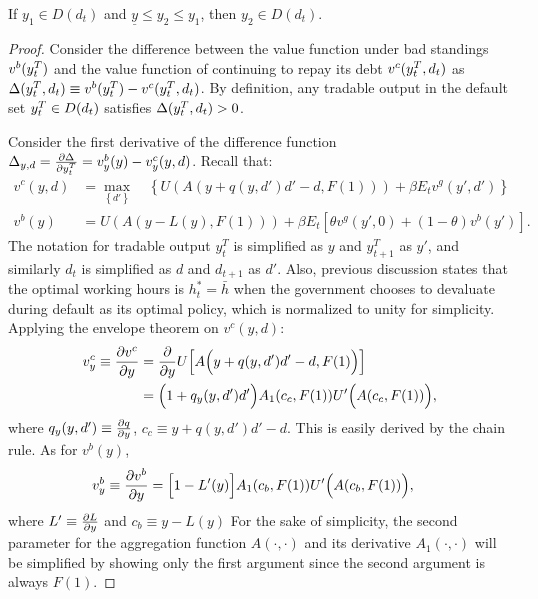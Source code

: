 \begin{proposition}
    \label{prop2}
    If $y_1 \in D(d_t)$ and $\underline{y}\le y_2 \le y_1$, then $y_2 \in D(d_t)$.
\end{proposition}
\begin{proof}
    Consider the difference between the value function under bad standings $v^b(y^T_{t})$ and the value function of continuing to repay its debt  $v^c(y^T_{t}, d_t)$ as $\Delta(y^T_{t}, d_t) \equiv v^b(y^T_{t}) - v^c(y^T_{t}, d_t)$. By definition, any tradable output in the default set $y^T_{t} \in D(d_t)$ satisfies $\Delta(y^T_{t}, d_t) >0$.

    Consider the first derivative of the difference function $\Delta_{y, d} = \pdv{\Delta}{y^T_t} = v^b_{y}(y) - v^c_{y}(y, d)$.
    Recall that:
    \begin{align*}
        v^c(y, d) &= \max_{\left\{d' \right\}} \quad
        \left\{
            U\left(
                A\left( y + q(y, d')d' - d, F(1)\right)
             \right)
             + \beta E_t
             v^g \left(
                y', d'
              \right)
         \right\}\\
        v^b(y) &=
            U\left(
                A\left( y - L(y), F(1)\right)
             \right)
             + \beta E_t \left[
                \theta v^g \left(
                    y', 0
                \right)
                + (1-\theta) v^b \left(
                    y'
                 \right)
            \right].
    \end{align*}
    The notation for tradable output $y^T_t$ is simplified as $y$ and $y^T_{t+1}$ as $y'$, and similarly $d_t$ is simplified as $d$ and $d_{t+1}$ as $d'$. Also, previous discussion states that the optimal working hours is $h^*_t = \bar{h}$ when the government chooses to devaluate during default as its optimal policy, which is normalized to unity for simplicity. Applying the envelope theorem on $v^c(y, d)$:
    \begin{align*}
        v^c_y \equiv \pdv{v^c}{y} &= \pdv{}{y} U\Big[ A\Big(y + q(y, d')d' - d, F(1)\Big)\Big]\\
        &=\Big(1 + q_y(y, d')d'\Big) A_1(c_c, F(1)) U'\Big(A(c_c, F(1))\Big),
    \end{align*}
    where $q_y(y, d') \equiv \pdv{q}{y}$, $c_c \equiv y + q(y, d')d' -d$. This is easily derived by the chain rule. As for $v^b(y)$,
    \begin{align*}
        v^b_y \equiv \pdv{v^b}{y} &=
        \Big[ 1 - L' (y)\Big] A_1 (c_b, F(1)) U' \Bigl(A(c_b, F(1))\Bigr),
    \end{align*}
    where $L' \equiv \pdv{L}{y}$ and $c_b \equiv y - L(y)$
    For the sake of simplicity, the second parameter for the aggregation function $A(\cdot, \cdot)$ and its derivative $A_1(\cdot,\cdot )$ will be simplified by showing only the first argument since the second argument is always $F(1)$.


\end{proof}
